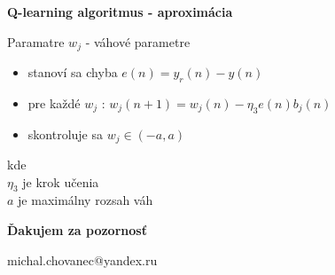 \documentclass[xcolor=dvipsnames]{beamer}
\begin{document}
\begin{frame}{\bf Q-learning algoritmus - aproximácia}

Paramatre $w_{j}$ - váhové parametre

\begin{itemize}
\item stanoví sa chyba $e(n) = y_r(n) - y(n)$
\item pre každé $w_{j}$ : $w_j(n+1)= w_j(n) -\eta_3 e(n)b_j(n)$
\item skontroluje sa $w_j \in (-a, a)$
\end{itemize}

kde \\
$\eta_3$ je krok učenia \\
$a$ je maximálny rozsah váh \\
\end{frame}


\begin{frame}{\bf Ďakujem za pozornosť}

\centerline{michal.chovanec@yandex.ru}

\end{frame}
\end{document}
